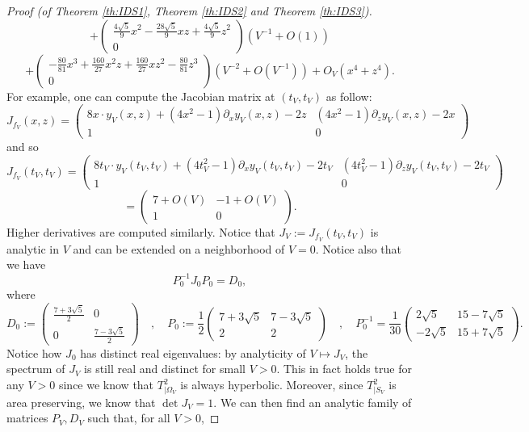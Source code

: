 \documentclass[a4paper]{article}
\theoremstyle{definition}
\begin{document}
\begin{proof}[Proof (of Theorem \ref{th:IDS1}, Theorem \ref{th:IDS2} and Theorem \ref{th:IDS3})]
$$ + \begin{pmatrix} \frac{4\sqrt{5}}{9} x^2 -\frac{28\sqrt{5}}{9}  xz + \frac{4\sqrt{5}}{9} z^2 \\ 0 \end{pmatrix} (V^{-1} + O(1)) $$ $$ +\begin{pmatrix} -\frac{80}{81} x^3 + \frac{160}{27} x^2 z + \frac{160}{27} x z^2 - \frac{80}{81} z^3 \\ 0 \end{pmatrix} (V^{-2} + O(V^{-1}))  + O_V(x^4+z^4). $$
For example, one can compute the Jacobian matrix at $(t_V,t_V)$ as follow:
$$ J_{f_V}(x,z) = \begin{pmatrix} 8x \cdot y_V(x,z) + (4x^2-1) \partial_xy_V(x,z) -2z & (4x^2-1) \partial_z y_V(x,z) - 2x \\ 1 & 0 \end{pmatrix} $$ 
and so
$$ J_{f_V}(t_V,t_V) = \begin{pmatrix} 8t_V \cdot y_V(t_V,t_V) + (4t_V^2-1)\partial_x y_V(t_V,t_V) - 2 t_V & (4t_V^2-1) \partial_z y_V(t_V,t_V) - 2t_V \\ 1 & 0 \end{pmatrix} $$ $$= \begin{pmatrix} 7  + O(V) & -1  + O(V) \\ 1 & 0 \end{pmatrix} . $$
Higher derivatives are computed similarly. Notice that $J_V := J_{f_V}(t_V,t_V)$ is analytic in $V$ and can be extended on a neighborhood of $V=0$. Notice also that we have
$$ P_0^{-1} J_0 P_0 = D_0, $$
where $$ D_0 := \begin{pmatrix} \frac{7+3\sqrt{5}}{2} & 0 \\ 0 & \frac{7-3\sqrt{5}}{2}  \end{pmatrix}  \quad , \quad P_0 := \frac{1}{2}\begin{pmatrix} 7+3\sqrt{5} & 7-3\sqrt{5} \\ 2 & 2 \end{pmatrix} \quad , \quad P_0^{-1} = \frac{1}{30}\begin{pmatrix} 2\sqrt{5} & 15-7 \sqrt{5} \\ -2\sqrt{5} & 15+7\sqrt{5} \end{pmatrix}.$$
Notice how $J_0$ has distinct real eigenvalues: by analyticity of $V \mapsto J_V$, the spectrum of $J_V$ is still real and distinct for small $V>0$. This in fact holds true for any $V>0$ since we know that $T_{|\Omega_V}^2$ is always hyperbolic. Moreover, since $T^2_{|S_V}$ is area preserving, we know that $\det J_V=1$. We can then find an analytic family of matrices $P_V,D_V$ such that, for all $V>0$,

\end{proof}
\end{document}
